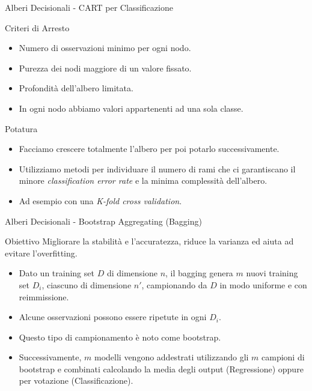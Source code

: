 \documentclass[9pt, xcolor=table]{beamer}
\begin{document}
	\begin{frame}{Alberi Decisionali - CART per Classificazione}
		\begin{block}{Criteri di Arresto}
			\begin{itemize}
				\item Numero di osservazioni minimo per ogni nodo.
				\item Purezza dei nodi maggiore di un valore fissato.
				\item Profondità dell'albero limitata.				
				\item In ogni nodo abbiamo valori appartenenti ad una sola classe.
			\end{itemize}
		\end{block}
		
		\begin{block}{Potatura}
			\begin{itemize}
				\item Facciamo crescere totalmente l'albero per poi potarlo successivamente.
				\item Utilizziamo metodi per individuare il numero di rami che ci garantiscano il
				minore \textit{classification error rate} e la minima complessità dell'albero.		
				\item Ad esempio con una \textit{K-fold cross validation}.
			\end{itemize}
		\end{block}
	\end{frame}

	\begin{frame}{Alberi Decisionali - Bootstrap Aggregating (Bagging)}	
		\begin{block}{Obiettivo}
			Migliorare la stabilità e l'accuratezza, riduce la varianza ed aiuta ad evitare l'overfitting.
		\end{block}
	
		\begin{itemize}
			\item Dato un training set $D$ di dimensione $n$, il bagging genera $m$ nuovi training set $D_ {i}$, ciascuno di dimensione $n'$, campionando da $D$ in modo uniforme e con reimmissione.
			\item Alcune osservazioni possono essere ripetute in ogni $D_ {i}$.
			\item Questo tipo di campionamento è noto come bootstrap.	
			\item Successivamente, $m$ modelli vengono addestrati utilizzando gli $m$ campioni di bootstrap e combinati calcolando la media degli output (Regressione) oppure per votazione (Classificazione).
		\end{itemize}
	\end{frame}
\end{document}

